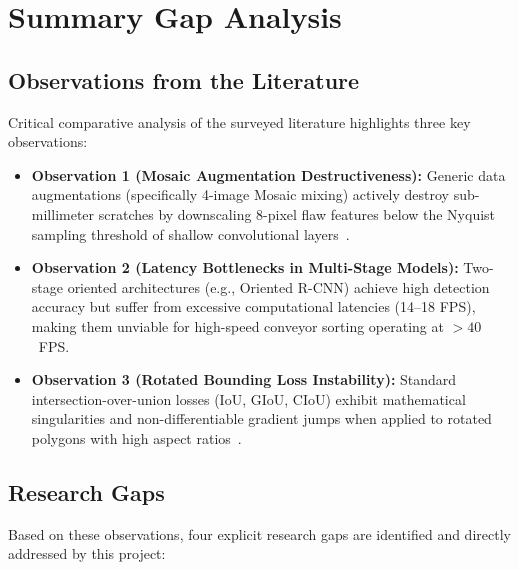 \section{Summary Gap Analysis}
\label{sec:gapanalysis}

\subsection{Observations from the Literature}
\label{subsec:observations}

Critical comparative analysis of the surveyed literature highlights three key observations:

\begin{itemize}
\item \textbf{Observation 1 (Mosaic Augmentation Destructiveness):} Generic data augmentations (specifically 4-image Mosaic mixing) actively destroy sub-millimeter scratches by downscaling 8-pixel flaw features below the Nyquist sampling threshold of shallow convolutional layers~\cite{lin2024augmentation}.
\item \textbf{Observation 2 (Latency Bottlenecks in Multi-Stage Models):} Two-stage oriented architectures (e.g., Oriented R-CNN) achieve high detection accuracy but suffer from excessive computational latencies (14--18 FPS), making them unviable for high-speed conveyor sorting operating at $>40$~FPS.
\item \textbf{Observation 3 (Rotated Bounding Loss Instability):} Standard intersection-over-union losses (IoU, GIoU, CIoU) exhibit mathematical singularities and non-differentiable gradient jumps when applied to rotated polygons with high aspect ratios~\cite{deng2024probiou,yang2024gradient}.
\end{itemize}

\subsection{Research Gaps}
\label{subsec:gaps}

Based on these observations, four explicit research gaps are identified and directly addressed by this project:

